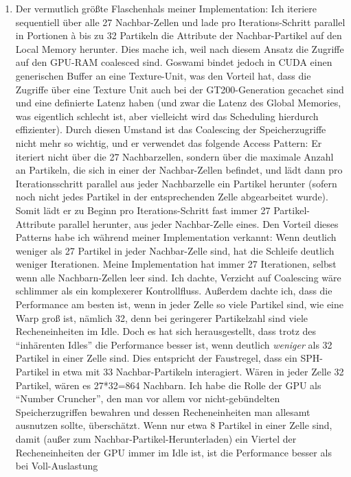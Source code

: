 \begin{enumerate}
		\item 
		\label{enum:goswamiAccessPattern}
		Der vermutlich größte Flaschenhals meiner Implementation:
		Ich iteriere sequentiell über alle 27 Nachbar-Zellen und lade pro Iterations-Schritt parallel in Portionen
		à bis zu 32 Partikeln die Attribute der Nachbar-Partikel auf den Local Memory herunter.
		Dies mache ich, weil nach diesem Ansatz die Zugriffe auf den GPU-RAM coalesced sind.
		Goswami bindet jedoch in CUDA einen generischen Buffer an eine Texture-Unit,
		was den Vorteil hat, dass die Zugriffe über eine Texture Unit auch bei der GT200-Generation 
		gecachet sind und eine definierte Latenz 
		haben (und zwar die Latenz des Global Memories, was eigentlich schlecht ist, aber vielleicht wird das Scheduling 
		hierdurch effizienter). Durch diesen Umstand ist das Coalescing der Speicherzugriffe nicht mehr so wichtig,
		und er verwendet das folgende  Access Pattern: Er iteriert nicht über die 27 Nachbarzellen, sondern über die
		maximale Anzahl an Partikeln, die sich in einer der Nachbar-Zellen befindet, und lädt dann pro 
		Iterationsschritt parallel aus jeder Nachbarzelle ein Partikel herunter (sofern noch nicht jedes Partikel 
		in der entsprechenden Zelle abgearbeitet wurde). 
		Somit lädt er zu Beginn pro Iterations-Schritt fast immer 27 Partikel-Attribute parallel herunter, 
		aus jeder Nachbar-Zelle eines.
		Den Vorteil dieses Patterns habe ich während meiner Implementation verkannt: Wenn deutlich weniger
		als 27 Partikel in jeder Nachbar-Zelle sind, hat die Schleife deutlich weniger Iterationen. 
		Meine Implementation hat immer 27 Iterationen, selbst wenn alle Nachbarn-Zellen leer sind.
		Ich dachte, Verzicht auf Coalescing wäre schlimmer als ein komplexerer Kontrollfluss. 
		Außerdem dachte ich, dass die Performance am besten ist, wenn in jeder Zelle so viele Partikel sind,
		wie eine Warp groß ist, nämlich 32, denn bei geringerer Partikelzahl sind viele Recheneinheiten im Idle.
		Doch es hat sich herausgestellt, dass trotz des "`inhärenten Idles"' die Performance besser ist, wenn
		deutlich \emph{weniger} als 32 Partikel in einer Zelle sind. Dies entspricht der Faustregel,
		dass ein SPH-Partikel in etwa mit 33 Nachbar-Partikeln interagiert. Wären in jeder Zelle 32 Partikel,
		wären es 27*32=864 Nachbarn. Ich habe die Rolle der GPU als "`Number Cruncher"', den man vor allem
		vor nicht-gebündelten Speicherzugriffen bewahren und dessen Recheneinheiten man allesamt ausnutzen sollte,
		überschätzt.
		Wenn nur etwa 8 Partikel in einer Zelle sind, damit (außer zum Nachbar-Partikel-Herunterladen)
		ein Viertel der Recheneinheiten der GPU immer im Idle ist, ist die Performance besser als bei Voll-Auslastung

\end{enumerate}
